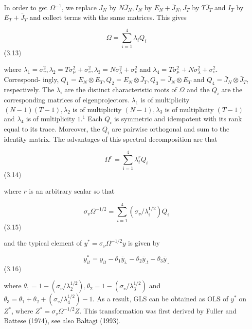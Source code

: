 \documentclass[
]{book}
\begin{document}
In order to get \(\Omega^{-1}\), we replace \(J_{N}\) by \(N \bar{J}_{N}, I_{N}\) by \(E_{N}+\bar{J}_{N}, J_{T}\) by \(T \bar{J}_{T}\) and \(I_{T}\) by \(E_{T}+\bar{J}_{T}\) and collect terms with the same matrices. This gives

\begin{equation}
\Omega=\sum_{i=1}^{4} \lambda_{i} Q_{i}
\end{equation} (3.13)

where \(\lambda_{1}=\sigma_{v}^{2}, \lambda_{2}=T \sigma_{\mu}^{2}+\sigma_{v}^{2}, \lambda_{3}=N \sigma_{\lambda}^{2}+\sigma_{v}^{2}\) and \(\lambda_{4}=T \sigma_{\mu}^{2}+N \sigma_{\lambda}^{2}+\sigma_{v}^{2}\). Correspond-
ingly, \(Q_{1}=E_{N} \otimes E_{T}, Q_{2}=E_{N} \otimes \bar{J}_{T}, Q_{3}=\bar{J}_{N} \otimes E_{T}\) and \(Q_{4}=\bar{J}_{N} \otimes \bar{J}_{T}\), respectively.
The \(\lambda_{i}\) are the distinct characteristic roots of \(\Omega\) and the \(Q_{i}\) are the corresponding matrices of eigenprojectors. \(\lambda_{1}\) is of multiplicity \((N-1)(T-1), \lambda_{2}\) is of multiplicity \((N-1), \lambda_{3}\) is of multiplicity \((T-1)\) and \(\lambda_{4}\) is of multiplicity \(1 .{ }^{1}\) Each \(Q_{i}\) is symmetric and idempotent with its rank equal to its trace. Moreover, the \(Q_{i}\) are pairwise orthogonal and sum to the identity matrix. The advantages of this spectral decomposition are that

\begin{equation}
\Omega^{r} =\sum_{i=1}^{4} \lambda_{i}^{r} Q_{i}
\end{equation} (3.14)

where \(r\) is an arbitrary scalar so that

\begin{equation}
\sigma_{v} \Omega^{-1 / 2}=\sum_{i=1}^{4}\left(\sigma_{v} / \lambda_{i}^{1 / 2}\right) Q_{i}
\end{equation} (3.15)

and the typical element of \(y^{*}=\sigma_{\nu} \Omega^{-1 / 2} y\) is given by

\begin{equation}
y_{i t}^{*}=y_{i t}-\theta_{1} \bar{y}_{i .}-\theta_{2} \bar{y}_{. t}+\theta_{3} \bar{y}_{. .}
\end{equation} (3.16)

where \(\theta_{1}=1-\left(\sigma_{v} / \lambda_{2}^{1 / 2}\right), \theta_{2}=1-\left(\sigma_{v} / \lambda_{3}^{1 / 2}\right)\) and \(\theta_{3}=\theta_{1}+\theta_{2}+\left(\sigma_{v} / \lambda_{4}^{1 / 2}\right)-1\). As a result,
GLS can be obtained as OLS of \(y^{*}\) on \(Z^{*}\), where \(Z^{*}=\sigma_{\nu} \Omega^{-1 / 2} Z\). This transformation was first derived by Fuller and Battese (1974), see also Baltagi (1993).
\end{document}
